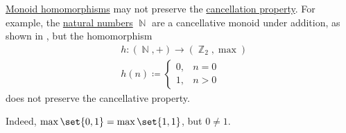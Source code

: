 \begin{example}\label{ex:monoid_cancellation_not_preserved_by_homomorphism}
  \hyperref[def:monoid/homomorphism]{Monoid homomorphisms} may not preserve the \hyperref[def:magma/cancellative]{cancellation property}. For example, the \hyperref[def:set_of_natural_numbers]{natural numbers} \( \BbbN \) are a cancellative monoid under addition, as shown in , but the homomorphism
  \begin{equation*}
    \begin{aligned}
      &h: (\BbbN, +) \to (\hyperref[thm:f2_is_boolean_algebra]{\BbbZ_2}, \max) \\
      &h(n) \coloneqq \begin{cases}
        0, &n = 0 \\
        1, &n > 0
      \end{cases}
    \end{aligned}
  \end{equation*}
  does not preserve the cancellative property.

  Indeed, \( \max\set{ 0, 1 } = \max\set{ 1, 1 } \), but \( 0 \neq 1 \).
\end{example}

